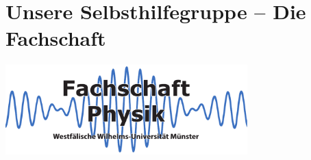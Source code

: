 
\section{Unsere Selbsthilfegruppe -- Die Fachschaft}
\begin{center}
\vspace{-0.5cm}
\includegraphics[width=0.7\textwidth]{res/fsphys_logo.pdf}
\vspace{-0.5cm}
\end{center}

